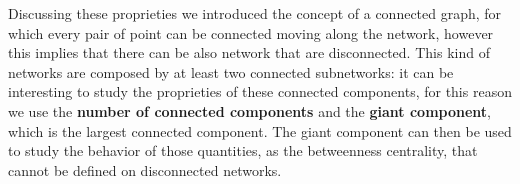 Discussing these proprieties we introduced the concept of a connected graph, for which every pair of point can be connected moving along the network, however this implies that there can be also network that are disconnected. This kind of networks are composed by at least two connected subnetworks: it can be interesting to study the proprieties of these connected components, for this reason we use the \textbf{number of connected components} and the \textbf{giant component}, which is the largest connected component. The giant component can then be used to study the behavior of those quantities, as the betweenness centrality, that cannot be defined on disconnected networks. 
